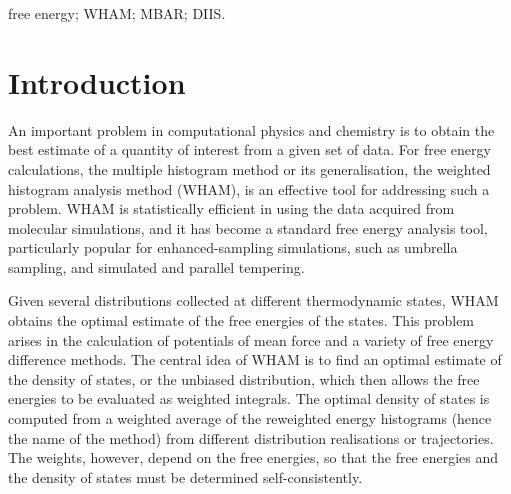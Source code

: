 \documentclass{gMOS2e}
\begin{document}
\begin{keywords}
free energy;
WHAM;
MBAR;
DIIS.
\end{keywords}





\section{Introduction}





An important problem in computational physics and chemistry
is to obtain the best estimate of a quantity of interest
from a given set of data\cite{
shirts2008}.
%
For free energy calculations,
the multiple histogram method\cite{
ferrenberg1988, ferrenberg1989,
newman, frenkel}
or its generalisation,
the weighted histogram analysis method (WHAM)\cite{
kumar1992, roux1995,
bartels1997, gallicchio2005, habeck2007, habeck2012,
souaille2001,
chodera2007, shirts2008, bereau2009,
hub2010, zhu2012},
is an effective tool for
addressing such a problem.
%
WHAM is statistically efficient in using the data
acquired from molecular simulations,
and it has become
a standard free energy analysis tool,
particularly popular
for enhanced-sampling simulations,
such as umbrella sampling\cite{
torrie1974, laio2002},
and simulated\cite{
marinari1992, lyubartsev1992}
and parallel\cite{
swendsen1986, geyer1991, hukushima1996, hansmann1997, earl2005}
tempering.




Given several distributions collected
at different thermodynamic states,
WHAM obtains the optimal estimate
of the free energies of the states.
%
This problem arises in the calculation of potentials of mean force and a variety of free energy difference methods.
%
The central idea of WHAM is to find an optimal estimate
of the density of states,
or the unbiased distribution,
which then allows
the free energies to be evaluated
as weighted integrals.
%
The optimal density of states
is computed from a weighted average
of the reweighted energy histograms
(hence the name of the method)
from different distribution realisations or trajectories.
%
The weights, however,
depend on the free energies,
so that
the free energies
and the density of states
must be determined self-consistently.
\end{document}
